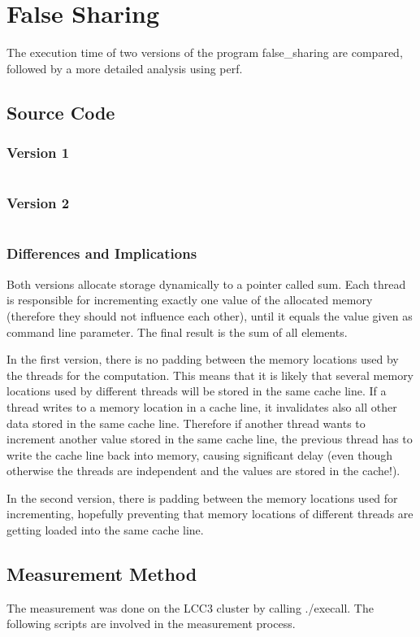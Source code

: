 \documentclass[parskip]{scrartcl}
\begin{document}
	\section{False Sharing}
	The execution time of two versions of the program false\_sharing are compared, followed by a more detailed analysis using perf.
	\subsection{Source Code}
	\subsubsection{Version 1}
	\inputminted{c}{false_sharing/false_sharing.c}
	\subsubsection{Version 2}
	\inputminted{c}{false_sharing/false_sharing_2.c}
	\subsubsection{Differences and Implications}
	Both versions allocate storage dynamically to a pointer called sum. Each thread is responsible for incrementing exactly one value of the allocated memory (therefore they should not influence each other), until it equals the value given as command line parameter. The final result is the sum of all elements.
	
	In the first version, there is no padding between the memory locations used by the threads for the computation. This means that it is likely that several memory locations used by different threads will be stored in the same cache line. If a thread writes to a memory location in a cache line, it invalidates also all other data stored in the same cache line. Therefore if another thread wants to increment another value stored in the same cache line, the previous thread has to write the cache line back into memory, causing significant delay (even though otherwise the threads are independent and the values are stored in the cache!).
	
	In the second version, there is padding between the memory locations used for incrementing, hopefully preventing that memory locations of different threads are getting loaded into the same cache line.
	
	\subsection{Measurement Method}
	The measurement was done on the LCC3 cluster by calling ./execall. The following scripts are involved in the measurement process.
\end{document}
